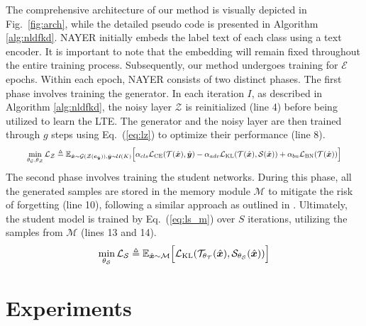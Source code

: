 \documentclass{article} %
\begin{document}
The comprehensive architecture of our method is visually depicted in Fig.~\ref{fig:arch}, while the detailed pseudo code is presented in Algorithm \ref{alg:nldfkd}. NAYER initially embeds the label text of each class using a text encoder. It is important to note that the embedding will remain fixed throughout the entire training process. Subsequently, our method undergoes training for $\mathcal{E}$ epochs. Within each epoch, NAYER consists of two distinct phases. The first phase involves training the generator. In each iteration $I$, as described in Algorithm \ref{alg:nldfkd}, the noisy layer $\mathcal{Z}$ is reinitialized (line 4) before being utilized to learn the LTE. The generator and the noisy layer are then trained through $g$ steps using Eq.~(\ref{eq:lz}) to optimize their performance (line 8).
\begin{align}
    \label{eq:lz}
\resizebox{0.92\textwidth}{!}{%
      $\min\limits_{\theta_\mathcal{G},\theta_\mathcal{Z}}\mathcal{L}_\mathcal{Z} \triangleq \mathbb{E}_{\hat{\vx} \sim \mathcal{G}(\mathcal{Z}(\ve_{\hat{\vy}})), \hat{\vy} \sim \mathcal{U}(K)}\Big[\alpha_{cls}\mathcal{L}_\text{CE}(\mathcal{T}(\hat{\vx}), \hat{\vy})-\alpha_{adv}\mathcal{L}_\text{KL}(\mathcal{T}(\hat{\vx}),\mathcal{S}(\hat{\vx}))+\alpha_{bn}\mathcal{L}_\text{BN}(\mathcal{T}(\hat{\vx}))\Big]$%
}
\end{align}
The second phase involves training the student networks. During this phase, all the generated samples are stored in the memory module $\mathcal{M}$ to mitigate the risk of forgetting (line 10), following a similar approach as outlined in \cite{fastdfkd}. Ultimately, the student model is trained by Eq.~(\ref{eq:ls_m}) over $S$ iterations, utilizing the samples from $\mathcal{M}$ (lines 13 and 14).
\begin{equation}
    \min\limits_{\theta_\mathcal{S}}\mathcal{L}_\mathcal{S} \triangleq \mathbb{E}_{\hat{{\bm{x}}} \sim\mathcal{M}}\Big[\mathcal{L}_\text{KL}(\mathcal{T}_{\theta_\mathcal{T}}(\hat{{\bm{x}}}),\mathcal{S}_{\theta_\mathcal{S}}(\hat{{\bm{x}}}))\Big]
    \label{eq:ls_m}
\end{equation}
\section{Experiments}
\end{document}
